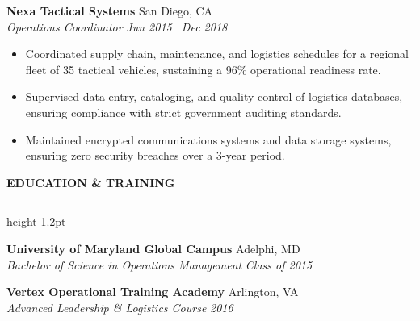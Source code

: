 \documentclass[10pt,letterpaper]{article}
\newcommand{\resumesection}[1]{%
  \vspace{7pt}%
  {\color{primarycolor}\bfseries\large\MakeUppercase{#1}}\par%
  \vspace{1.5pt}%
  {\color{accentcolor}\hrule height 1.2pt}\par%
  \vspace{4.5pt}%
}
\begin{document}
\vspace{6pt}

\textbf{Nexa Tactical Systems} \hfill San Diego, CA \\
\textit{Operations Coordinator} \hfill \textit{Jun 2015 \textendash\ Dec 2018}
\begin{itemize}[leftmargin=10pt,nosep,topsep=2pt]
    \item Coordinated supply chain, maintenance, and logistics schedules for a regional fleet of 35 tactical vehicles, sustaining a 96\% operational readiness rate.
    \item Supervised data entry, cataloging, and quality control of logistics databases, ensuring compliance with strict government auditing standards.
    \item Maintained encrypted communications systems and data storage systems, ensuring zero security breaches over a 3-year period.
\end{itemize}

\resumesection{Education \& Training}

\textbf{University of Maryland Global Campus} \hfill Adelphi, MD \\
\textit{Bachelor of Science in Operations Management} \hfill \textit{Class of 2015}

\vspace{4pt}

\textbf{Vertex Operational Training Academy} \hfill Arlington, VA \\
\textit{Advanced Leadership \& Logistics Course} \hfill \textit{2016}
\end{document}
